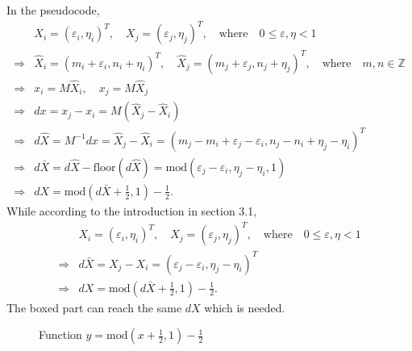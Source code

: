 \documentclass[a4paper]{article}
\begin{document}
In the pseudocode,
$$
\begin{aligned}
&X_{i} = (\varepsilon_{i}, \eta_{i})^{T}, \quad X_{j} = (\varepsilon_{j}, \eta_{j})^{T} ,\quad \text{where} \quad 0 \le \varepsilon, \eta < 1\\
 \Longrightarrow &\hat{X}_{i} = (m_{i}+\varepsilon_{i}, n_{i}+\eta_{i})^{T},\quad \hat{X}_{j} = (m_{j}+\varepsilon_{j}, n_{j}+\eta_{j})^{T},\quad \text{where} \quad m,n \in \mathbb{Z}\\
\Longrightarrow &x_{i}=M\hat{X}_{i}, \quad x_{j}=M\hat{X}_{j}\\
\Longrightarrow &dx = x_{j}-x_{i}=M(\hat{X}_{j}-\hat{X}_{i})\\
\Longrightarrow &d\hat{X} = M^{-1}dx=\hat{X}_{j}-\hat{X}_{i}=(m_{j}-m_{i}+\varepsilon_{j}-\varepsilon_{i}, n_{j}-n_{i}+\eta_{j}-\eta_{i})^{T}\\
\Longrightarrow &d\bar{X}=d\hat{X}-\text{floor}(d\hat{X})=\boxed{\text{mod}(\varepsilon_{j}-\varepsilon_{i},\eta_{j}-\eta_{i},1)}\\
\Longrightarrow &dX=\text{mod}(d\bar{X}+\frac{1}{2},1)-\frac{1}{2}.
\end{aligned}
$$
While according to the introduction in section 3.1,
$$
\begin{aligned}
&X_{i} = (\varepsilon_{i}, \eta_{i})^{T}, \quad X_{j} = (\varepsilon_{j}, \eta_{j})^{T} ,\quad \text{where} \quad 0 \le \varepsilon, \eta < 1\\
\Longrightarrow &d\bar{X}=X_{j}-X_{i}=\boxed{(\varepsilon_{j}-\varepsilon_{i}, \eta_{j}-\eta_{i})^{T}}\\
\Longrightarrow &dX=\text{mod}(d\bar{X}+\frac{1}{2},1)-\frac{1}{2}.
\end{aligned}
$$
The boxed part can reach the same $dX$ which is needed. 
\begin{figure}[!htbp]
\begin{center}
\end{center}
\caption{Function $y=\text{mod}(x+\frac{1}{2},1)-\frac{1}{2}$}
\end{figure}
\end{document}
